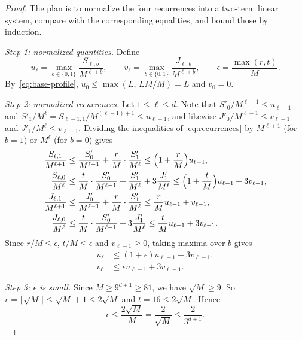 \documentclass[11pt]{article}
\theoremstyle{definition}
\theoremstyle{remark}
\begin{document}
\begin{proof}
The plan is to normalize the four recurrences into a two-term linear system, compare with the corresponding equalities, and bound those by induction.

\emph{Step 1: normalized quantities.} Define
\[
 u_\ell=\max_{b\in\{0,1\}}\frac{S_{\ell,b}}{M^{\ell+b}},
 \qquad
 v_\ell=\max_{b\in\{0,1\}}\frac{J_{\ell,b}}{M^{\ell+b}},
 \qquad
 \epsilon=\frac{\max(r,t)}{M}.
\]
By~\eqref{eq:base-profile}, \(u_0\le\max(L,\,LM/M)=L\) and \(v_0=0\).

\emph{Step 2: normalized recurrences.} Let \(1\le\ell\le d\). Note that \(S'_0/M^{\ell-1}\le u_{\ell-1}\) and \(S'_1/M^{\ell}=S_{\ell-1,1}/M^{(\ell-1)+1}\le u_{\ell-1}\), and likewise \(J'_0/M^{\ell-1}\le v_{\ell-1}\) and \(J'_1/M^{\ell}\le v_{\ell-1}\). Dividing the inequalities of \eqref{eq:recurrences} by \(M^{\ell+1}\) (for \(b=1\)) or \(M^{\ell}\) (for \(b=0\)) gives
\begin{align*}
 \frac{S_{\ell,1}}{M^{\ell+1}}
   &\le\frac{S'_0}{M^{\ell-1}}+\frac rM\cdot\frac{S'_1}{M^{\ell}}
   \le\Bigl(1+\frac rM\Bigr)u_{\ell-1},\\
 \frac{S_{\ell,0}}{M^\ell}
   &\le\frac tM\cdot\frac{S'_0}{M^{\ell-1}}+\frac{S'_1}{M^{\ell}}+3\frac{J'_1}{M^{\ell}}
   \le\Bigl(1+\frac tM\Bigr)u_{\ell-1}+3v_{\ell-1},\\
 \frac{J_{\ell,1}}{M^{\ell+1}}
   &\le\frac{J'_0}{M^{\ell-1}}+\frac rM\cdot\frac{S'_1}{M^{\ell}}
   \le \frac rM u_{\ell-1}+v_{\ell-1},\\
 \frac{J_{\ell,0}}{M^\ell}
   &\le\frac tM\cdot\frac{S'_0}{M^{\ell-1}}+3\frac{J'_1}{M^{\ell}}
   \le \frac tM u_{\ell-1}+3v_{\ell-1}.
\end{align*}
Since \(r/M\le\epsilon\), \(t/M\le\epsilon\) and \(v_{\ell-1}\ge0\), taking maxima over \(b\) gives
\begin{equation}
\label{eq:normalized-recurrences}
 \begin{split}
  u_\ell&\leq (1+\epsilon)u_{\ell-1}+3v_{\ell-1},\\
  v_\ell&\leq \epsilon u_{\ell-1}+3v_{\ell-1}.
 \end{split}
\end{equation}

\emph{Step 3: \(\epsilon\) is small.} Since \(M\ge9^{d+1}\ge81\), we have \(\sqrt M\ge9\). So \(r=\lceil\sqrt M\rceil\le\sqrt M+1\le2\sqrt M\) and \(t=16\le2\sqrt M\). Hence
\begin{equation}
\label{eq:epsilon-choice}
 \epsilon\leq\frac{2\sqrt M}{M}=\frac{2}{\sqrt M}\leq\frac{2}{3^{d+1}}.
\end{equation}


\end{proof}
\end{document}
